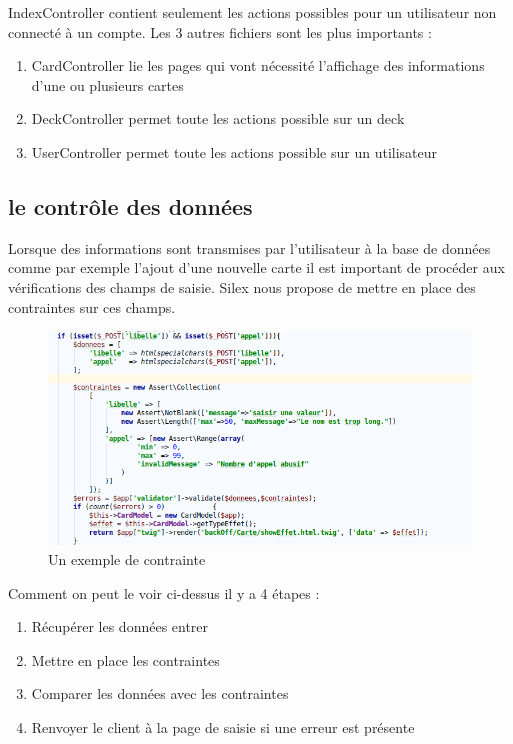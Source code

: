 \documentclass[a4paper, titlepage]{livret}
\begin{document}
	IndexController contient seulement les actions possibles pour un utilisateur non connecté à un compte. Les 3 autres fichiers sont les plus importants :

	\begin{enumerate}
		\item CardController lie les pages qui vont nécessité l'affichage des informations d'une ou plusieurs cartes
		\item DeckController permet toute les actions possible sur un deck
		\item UserController permet toute les actions possible sur un utilisateur
	\end{enumerate}

	\subsection{le contrôle des données}
	Lorsque des informations sont transmises par l'utilisateur à la base de données comme par exemple l'ajout d'une nouvelle carte il est important de procéder aux vérifications des champs de saisie. Silex nous propose de mettre en place des contraintes sur ces champs.
    \begin{figure}[th]
      \begin{center}
        \includegraphics[scale=0.4]{Assets/exemple_contrainte.png}
        \caption{Un exemple de contrainte}
        \label{fig8}
      \end{center}
    \end{figure}

	Comment on peut le voir ci-dessus il y a 4 étapes :
	\begin{enumerate}
		\item Récupérer les données entrer
		\item Mettre en place les contraintes
		\item Comparer les données avec les contraintes
		\item Renvoyer le client à la page de saisie si une erreur est présente
	\end{enumerate}
\end{document}

